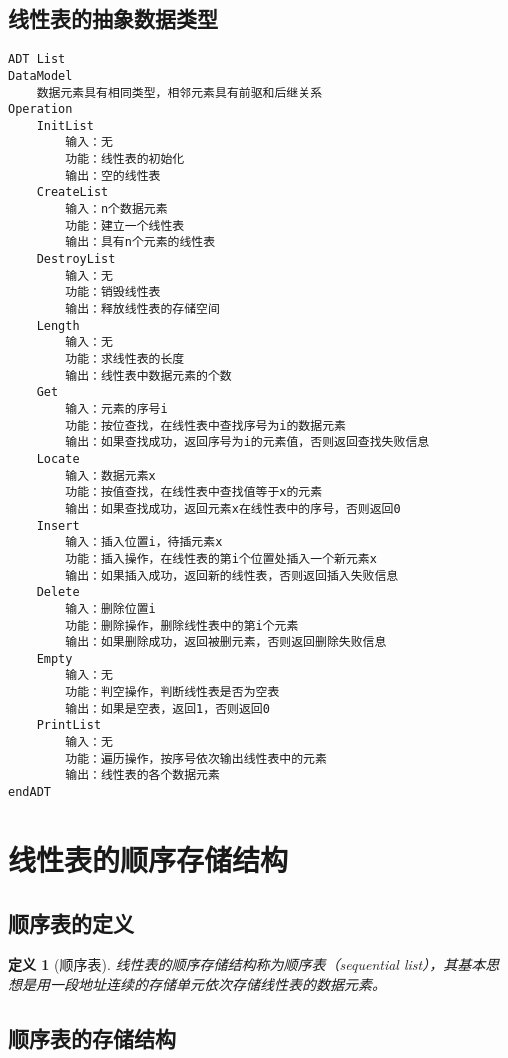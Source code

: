 \documentclass[12pt,a4paper]{amsart}
\newtheorem{definition}{定义}[section]
\begin{document}
\subsection{线性表的抽象数据类型}

\indent
\begin{lstlisting}[caption=线性表抽象数据类型定义]
ADT List
DataModel
    数据元素具有相同类型，相邻元素具有前驱和后继关系
Operation
    InitList
        输入：无
        功能：线性表的初始化
        输出：空的线性表
    CreateList
        输入：n个数据元素
        功能：建立一个线性表
        输出：具有n个元素的线性表
    DestroyList
        输入：无
        功能：销毁线性表
        输出：释放线性表的存储空间
    Length
        输入：无
        功能：求线性表的长度
        输出：线性表中数据元素的个数
    Get
        输入：元素的序号i
        功能：按位查找，在线性表中查找序号为i的数据元素
        输出：如果查找成功，返回序号为i的元素值，否则返回查找失败信息
    Locate
        输入：数据元素x
        功能：按值查找，在线性表中查找值等于x的元素
        输出：如果查找成功，返回元素x在线性表中的序号，否则返回0
    Insert
        输入：插入位置i，待插元素x
        功能：插入操作，在线性表的第i个位置处插入一个新元素x
        输出：如果插入成功，返回新的线性表，否则返回插入失败信息
    Delete
        输入：删除位置i
        功能：删除操作，删除线性表中的第i个元素
        输出：如果删除成功，返回被删元素，否则返回删除失败信息
    Empty
        输入：无
        功能：判空操作，判断线性表是否为空表
        输出：如果是空表，返回1，否则返回0
    PrintList
        输入：无
        功能：遍历操作，按序号依次输出线性表中的元素
        输出：线性表的各个数据元素
endADT
\end{lstlisting}

\section{线性表的顺序存储结构}

\subsection{顺序表的定义}

\begin{definition}[顺序表]
线性表的顺序存储结构称为顺序表（sequential list），其基本思想是用一段地址连续的存储单元依次存储线性表的数据元素。
\end{definition}

\subsection{顺序表的存储结构}
\end{document}
